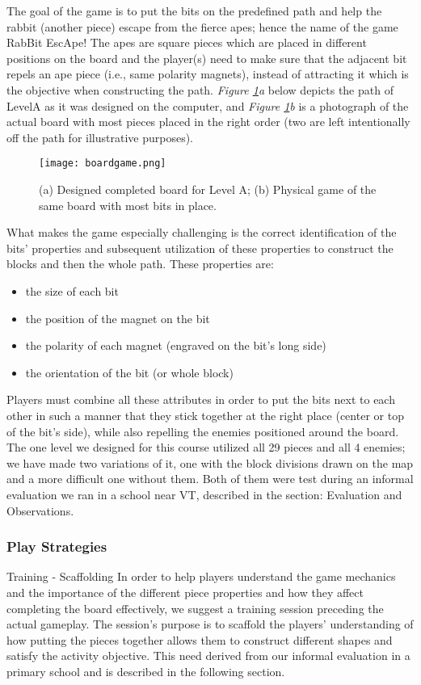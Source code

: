 \documentclass{acm_proc_article-sp}
\begin{document}
The goal of the game is to put the bits on the predefined path and help the rabbit (another piece) escape from the fierce apes; hence the name of the game RabBit EscApe! The apes are square pieces which are placed in different positions on the board and the player(s) need to make sure that the adjacent bit repels an ape piece (i.e., same polarity magnets), instead of attracting it which is the objective when constructing the path. {\em Figure \ref{fig:board-game}a} below depicts the path of LevelA as it was designed on the computer, and {\em Figure \ref{fig:board-game}b} is a photograph of the actual board with most pieces placed in the right order (two are left intentionally off the path for illustrative purposes).
\begin{figure}
  \texttt{[image: boardgame.png]}
  \caption{ (a) Designed completed board for Level A; (b) Physical game of the same board with most bits in place. }
  \label{fig:board-game}
\end{figure}

What makes the game especially challenging is the correct identification of the bits' properties and subsequent utilization of these properties to construct the blocks and then the whole path. These properties are:
\begin{itemize}
  \item{the size of each bit}
  \item{the position of the magnet on the bit}
  \item{the polarity of each magnet (engraved on the bit's long side)}
  \item{the orientation of the bit (or whole block)}
\end{itemize}

Players must combine all these attributes in order to put the bits next to each other in such a manner that they stick together at the right place (center or top of the bit's side), while also repelling the enemies positioned around the board. The one level we designed for this course utilized all 29 pieces and all 4 enemies; we have made two variations of it, one with the block divisions drawn on the map and a more difficult one without them. Both of them were test during an informal evaluation we ran in a school near VT, described in the section: Evaluation and Observations.

\subsubsection{Play Strategies}
Training - Scaffolding
In order to help players understand the game mechanics and the importance of the different piece properties and how they affect completing the board effectively, we suggest a training session preceding the actual gameplay. The session's purpose is to scaffold the players' understanding of how putting the pieces together allows them to construct different shapes and satisfy the activity objective. This need derived from our informal evaluation in a primary school and is described in the following section.
\end{document}
